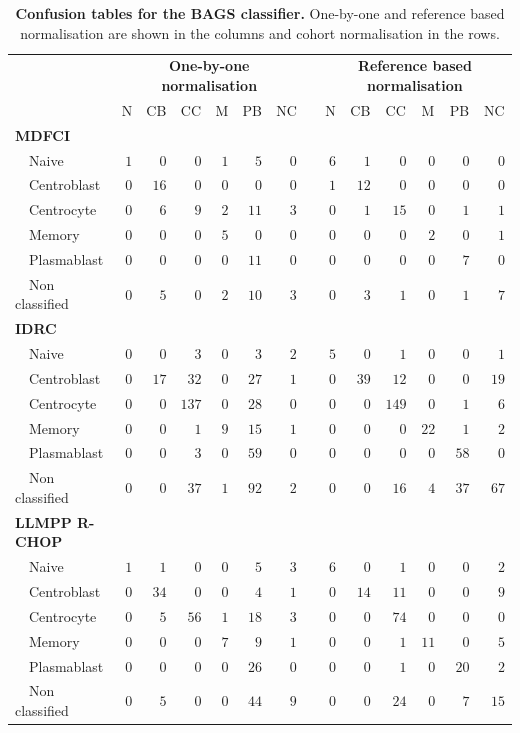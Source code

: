 \documentclass{article}
\begin{document}
\begin{table}[!tbp]
\small
\caption{\textbf{Confusion tables for the BAGS classifier.} One-by-one and reference based normalisation are shown in the columns and cohort normalisation in the rows.\label{tab:BAGShemaclass}}
\begin{center}
\begin{tabular}{lrrrrrrcrrrrrr}
\hline\hline
\multicolumn{1}{l}{\bfseries  }&\multicolumn{6}{c}{\bfseries One-by-one normalisation}&\multicolumn{1}{c}{\bfseries }&\multicolumn{6}{c}{\bfseries Reference based normalisation}\tabularnewline
\cline{2-7} \cline{9-14}
\multicolumn{1}{l}{}&\multicolumn{1}{c}{N}&\multicolumn{1}{c}{CB}&\multicolumn{1}{c}{CC}&\multicolumn{1}{c}{M}&\multicolumn{1}{c}{PB}&\multicolumn{1}{c}{NC}&\multicolumn{1}{c}{}&\multicolumn{1}{c}{N}&\multicolumn{1}{c}{CB}&\multicolumn{1}{c}{CC}&\multicolumn{1}{c}{M}&\multicolumn{1}{c}{PB}&\multicolumn{1}{c}{NC}\tabularnewline
\hline
{\bfseries MDFCI}&&&&&&&&&&&&&\tabularnewline
~~Naive&$1$&$ 0$&$  0$&$1$&$ 5$&$0$&&$6$&$ 1$&$  0$&$ 0$&$ 0$&$ 0$\tabularnewline
~~Centroblast&$0$&$16$&$  0$&$0$&$ 0$&$0$&&$1$&$12$&$  0$&$ 0$&$ 0$&$ 0$\tabularnewline
~~Centrocyte&$0$&$ 6$&$  9$&$2$&$11$&$3$&&$0$&$ 1$&$ 15$&$ 0$&$ 1$&$ 1$\tabularnewline
~~Memory&$0$&$ 0$&$  0$&$5$&$ 0$&$0$&&$0$&$ 0$&$  0$&$ 2$&$ 0$&$ 1$\tabularnewline
~~Plasmablast&$0$&$ 0$&$  0$&$0$&$11$&$0$&&$0$&$ 0$&$  0$&$ 0$&$ 7$&$ 0$\tabularnewline
~~Non classified&$0$&$ 5$&$  0$&$2$&$10$&$3$&&$0$&$ 3$&$  1$&$ 0$&$ 1$&$ 7$\tabularnewline
\hline
{\bfseries IDRC}&&&&&&&&&&&&&\tabularnewline
~~Naive&$0$&$ 0$&$  3$&$0$&$ 3$&$2$&&$5$&$ 0$&$  1$&$ 0$&$ 0$&$ 1$\tabularnewline
~~Centroblast&$0$&$17$&$ 32$&$0$&$27$&$1$&&$0$&$39$&$ 12$&$ 0$&$ 0$&$19$\tabularnewline
~~Centrocyte&$0$&$ 0$&$137$&$0$&$28$&$0$&&$0$&$ 0$&$149$&$ 0$&$ 1$&$ 6$\tabularnewline
~~Memory&$0$&$ 0$&$  1$&$9$&$15$&$1$&&$0$&$ 0$&$  0$&$22$&$ 1$&$ 2$\tabularnewline
~~Plasmablast&$0$&$ 0$&$  3$&$0$&$59$&$0$&&$0$&$ 0$&$  0$&$ 0$&$58$&$ 0$\tabularnewline
~~Non classified&$0$&$ 0$&$ 37$&$1$&$92$&$2$&&$0$&$ 0$&$ 16$&$ 4$&$37$&$67$\tabularnewline
\hline
{\bfseries LLMPP R-CHOP}&&&&&&&&&&&&&\tabularnewline
~~Naive&$1$&$ 1$&$  0$&$0$&$ 5$&$3$&&$6$&$ 0$&$  1$&$ 0$&$ 0$&$ 2$\tabularnewline
~~Centroblast&$0$&$34$&$  0$&$0$&$ 4$&$1$&&$0$&$14$&$ 11$&$ 0$&$ 0$&$ 9$\tabularnewline
~~Centrocyte&$0$&$ 5$&$ 56$&$1$&$18$&$3$&&$0$&$ 0$&$ 74$&$ 0$&$ 0$&$ 0$\tabularnewline
~~Memory&$0$&$ 0$&$  0$&$7$&$ 9$&$1$&&$0$&$ 0$&$  1$&$11$&$ 0$&$ 5$\tabularnewline
~~Plasmablast&$0$&$ 0$&$  0$&$0$&$26$&$0$&&$0$&$ 0$&$  1$&$ 0$&$20$&$ 2$\tabularnewline
~~Non classified&$0$&$ 5$&$  0$&$0$&$44$&$9$&&$0$&$ 0$&$ 24$&$ 0$&$ 7$&$15$\tabularnewline

\end{tabular}
\end{center}
\end{table}
\end{document}

